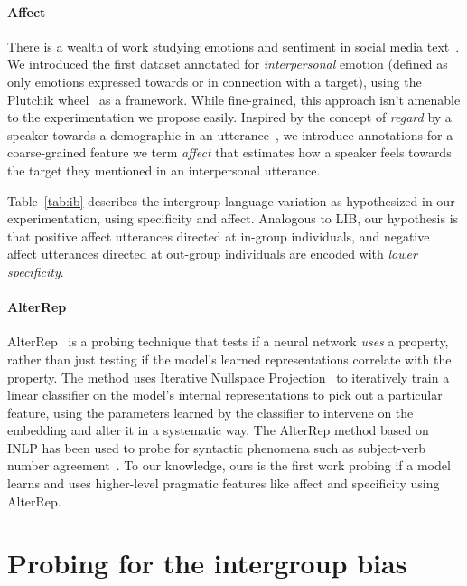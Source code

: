 

\paragraph{Affect} There is a wealth of work studying emotions and sentiment in social media text~\citep{mohammad-2012-emotional,6406313, Mohammad2015UsingHT, abdul-mageed-ungar-2017-emonet,desai-etal-2020-detecting,demszky-etal-2020-goemotions}. We introduced the first dataset annotated for \emph{interpersonal} emotion (defined as only emotions expressed towards or in connection with a target), using the Plutchik wheel~\citep{plutchik2001nature} as a framework. While fine-grained, this approach isn't amenable to the experimentation we propose easily. Inspired by the concept of \emph{regard} by a speaker towards a demographic in an utterance~\citep{sheng-etal-2019-woman}, we introduce annotations for a coarse-grained feature we term \emph{affect} that estimates how a speaker feels towards the target they mentioned in an interpersonal utterance.

Table~\ref{tab:ib} describes the intergroup language variation as hypothesized in our experimentation, using specificity and affect. Analogous to LIB, our hypothesis is that positive affect utterances directed at in-group individuals, and negative affect utterances directed at out-group individuals are encoded with \emph{lower specificity}.

\paragraph{AlterRep} AlterRep~\citep{ravfogel-etal-2021-counterfactual} is a probing technique that tests if a neural network \emph{uses} a property, rather than just testing if the model's learned representations correlate with the property. The method uses Iterative Nullspace Projection~\citep[INLP;][]{ravfogel-etal-2020-null} to iteratively train a linear classifier on the model's internal representations to pick out a particular feature, using the parameters learned by the classifier to intervene on the embedding and alter it in a systematic way. The AlterRep method based on INLP has been used to probe for syntactic phenomena such as subject-verb number agreement~\citep{ravfogel-etal-2021-counterfactual}. To our knowledge, ours is the first work probing if a model learns and uses higher-level pragmatic features like affect and specificity using AlterRep.

\section{Probing for the intergroup bias}

